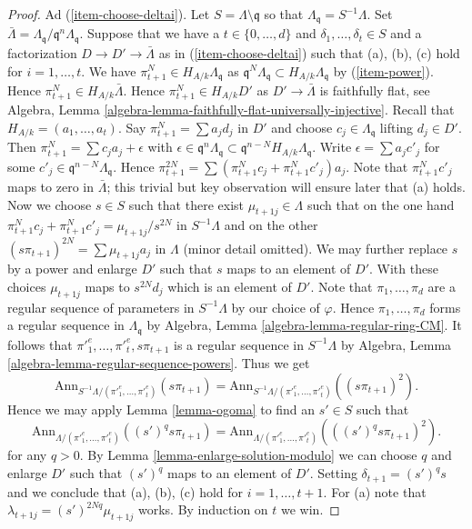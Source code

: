 \begin{proof}
\medskip\noindent
Ad (\ref{item-choose-deltai}). Let $S = \Lambda \setminus \mathfrak q$
so that $\Lambda_\mathfrak q = S^{-1}\Lambda$. Set
$\bar \Lambda = \Lambda_\mathfrak q/\mathfrak q^n \Lambda_\mathfrak q$.
Suppose that we have a $t \in \{0, \ldots, d\}$ and
$\delta_1, \ldots, \delta_t \in S$ and a factorization
$D \to D' \to \bar \Lambda$ as in (\ref{item-choose-deltai})
such that (a), (b), (c) hold for $i = 1, \ldots, t$. We have
$\pi_{t + 1}^N \in H_{A/k}\Lambda_\mathfrak q$
as $\mathfrak q^N \Lambda_\mathfrak q \subset H_{A/k}\Lambda_\mathfrak q$
by (\ref{item-power}). Hence
$\pi_{t + 1}^N \in H_{A/k} \bar\Lambda$. Hence
$\pi_{t + 1}^N \in H_{A/k}D'$ as $D' \to \bar \Lambda$
is faithfully flat, see
Algebra, Lemma \ref{algebra-lemma-faithfully-flat-universally-injective}.
Recall that $H_{A/k} = (a_1, \ldots, a_t)$.
Say $\pi_{t + 1}^N = \sum a_j d_j$ in $D'$ and choose
$c_j \in \Lambda_\mathfrak q$ lifting $d_j \in D'$. Then
$\pi_{t + 1}^N = \sum c_j a_j + \epsilon$ with
$\epsilon \in \mathfrak q^n\Lambda_\mathfrak q \subset
\mathfrak q^{n - N}H_{A/k}\Lambda_\mathfrak q$.
Write $\epsilon = \sum a_j c'_j$ for some
$c'_j \in \mathfrak q^{n - N}\Lambda_\mathfrak q$.
Hence $\pi_{t + 1}^{2N} = \sum (\pi_{t + 1}^N c_j + \pi_{t + 1}^N c'_j) a_j$.
Note that $\pi_{t + 1}^Nc'_j$ maps to zero in $\bar \Lambda$; this trivial
but key observation will ensure later that (a) holds.
Now we choose $s \in S$ such that there exist
$\mu_{t + 1j} \in \Lambda$ such that on the one hand
$\pi_{t + 1}^N c_j + \pi_{t + 1}^N c'_j = \mu_{t + 1j}/s^{2N}$
in $S^{-1}\Lambda$ and on the other
$(s \pi_{t + 1})^{2N} = \sum \mu_{t + 1j}a_j$
in $\Lambda$ (minor detail omitted). We may further replace $s$ by
a power and enlarge $D'$ such that $s$ maps to an element of $D'$.
With these choices $\mu_{t + 1j}$ maps to $s^{2N}d_j$ which is
an element of $D'$. Note that $\pi_1, \ldots, \pi_d$ are a regular
sequence of parameters in $S^{-1}\Lambda$ by our
choice of $\varphi$. Hence $\pi_1, \ldots, \pi_d$ forms a regular sequence
in $\Lambda_\mathfrak q$ by
Algebra, Lemma \ref{algebra-lemma-regular-ring-CM}.
It follows that ${\pi'}_1^e, \ldots, {\pi'}_t^e, s\pi_{t + 1}$ is a
regular sequence in $S^{-1}\Lambda$ by
Algebra, Lemma \ref{algebra-lemma-regular-sequence-powers}.
Thus we get
$$
\text{Ann}_{S^{-1}\Lambda/({\pi'}_1^e, \ldots, {\pi'}_t^e)}(s\pi_{t + 1}) =
\text{Ann}_{S^{-1}\Lambda/({\pi'}_1^e, \ldots, {\pi'}_t^e)}((s\pi_{t + 1})^2).
$$
Hence we may apply Lemma \ref{lemma-ogoma} to find an $s' \in S$
such that
$$
\text{Ann}_{\Lambda/({\pi'}_1^e, \ldots, {\pi'}_t^e)}((s')^qs\pi_{t + 1})
=
\text{Ann}_{\Lambda/({\pi'}_1^e, \ldots, {\pi'}_t^e)}(((s')^qs\pi_{t + 1})^2).
$$
for any $q > 0$. By Lemma \ref{lemma-enlarge-solution-modulo}
we can choose $q$ and enlarge $D'$ such that $(s')^q$ maps to an element
of $D'$. Setting $\delta_{t + 1} = (s')^qs$ and we conclude that
(a), (b), (c) hold for $i = 1, \ldots, t + 1$. For (a) note that
$\lambda_{t + 1j} = (s')^{2Nq}\mu_{t + 1j}$ works.
By induction on $t$ we win.


\end{proof}
